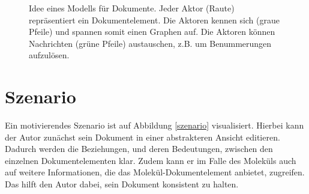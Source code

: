 \begin{figure}[h!]
\centering
\advance\leftskip-2.5cm
\caption[Idee eines Modells für Dokumente]{ Idee eines Modells für Dokumente. Jeder Aktor (Raute) repräsentiert ein Dokumentelement. Die Aktoren kennen sich (graue Pfeile) und spannen somit einen Graphen auf. Die Aktoren können Nachrichten (grüne Pfeile) austauschen, z.B. um Benummerungen aufzulösen. }\label{idee}
\end{figure}
 
\section{Szenario}\label{}
 
Ein motivierendes Szenario ist auf Abbildung \ref{szenario} visualisiert. Hierbei kann der Autor zunächst sein Dokument in einer abstrakteren Ansicht editieren. Dadurch werden die Beziehungen, und deren Bedeutungen, zwischen den einzelnen Dokumentelementen klar. Zudem kann er im Falle des Moleküls auch auf weitere Informationen, die das Molekül-Dokumentelement anbietet, zugreifen. Das hilft den Autor dabei, sein Dokument konsistent zu halten.


